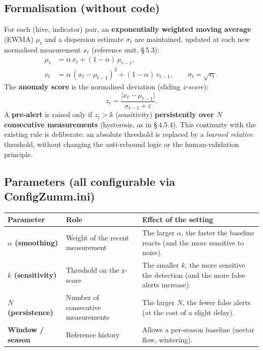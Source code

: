 \subsection{Formalisation (without code)}
For each (hive, indicator) pair, an \textbf{exponentially weighted moving
average} (EWMA) $\mu_t$ and a dispersion estimate $\sigma_t$ are maintained,
updated at each new normalised measurement $x_t$ (reference unit, §\,5.3):
\begin{align}
  \mu_t      &= \alpha\,x_t + (1-\alpha)\,\mu_{t-1}, \\
  v_t        &= \alpha\,(x_t-\mu_{t-1})^2 + (1-\alpha)\,v_{t-1},
                \qquad \sigma_t = \sqrt{v_t}.
\end{align}
The \textbf{anomaly score} is the normalised deviation (sliding \emph{z-score}):
\begin{equation}
  z_t = \frac{\lvert x_t - \mu_{t-1}\rvert}{\sigma_{t-1} + \varepsilon}.
\end{equation}
A \textbf{pre-alert} is raised only if $z_t > k$ (sensitivity) \textbf{persistently
over $N$ consecutive measurements} (hysteresis, as in §\,4.5.4). This continuity
with the existing rule is deliberate: an absolute threshold is replaced by a
\emph{learned relative} threshold, without changing the anti-rebound logic or the
human-validation principle.

\subsection{Parameters (all configurable via ConfigZumm.ini)}
\begin{xltabular}{\textwidth}{>{\bfseries}p{2.6cm} p{2.4cm} X}
\toprule
\textbf{Parameter} & \textbf{Role} & \textbf{Effect of the setting} \\
\midrule
\endhead
$\alpha$ (smoothing) & Weight of the recent measurement & The larger $\alpha$, the faster the baseline reacts (and the more sensitive to noise). \\
$k$ (sensitivity) & Threshold on the z-score & The smaller $k$, the more sensitive the detection (and the more false alerts increase). \\
$N$ (persistence) & Number of consecutive measurements & The larger $N$, the fewer false alerts (at the cost of a slight delay). \\
Window / season & Reference history & Allows a per-season baseline (nectar flow, wintering). \\
\bottomrule
\end{xltabular}

